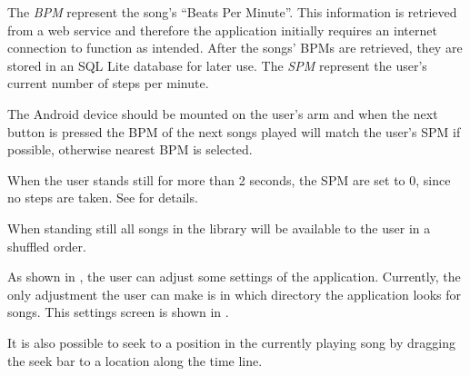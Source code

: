 The \textit{BPM} represent the song's ``Beats Per Minute''. This information is retrieved from a web service and therefore the application initially requires an internet connection to function as intended. After the songs' BPMs are retrieved, they are stored in an SQL Lite database for later use. The \textit{SPM} represent the user's current number of steps per minute.

The Android device should be mounted on the user's arm and when the next button is pressed the BPM of the next songs played will match the user's SPM if possible, otherwise nearest BPM is selected.

When the user stands still for more than 2 seconds, the SPM are set to 0, since no steps are taken. See  for details. 

When standing still all songs in the library will be available to the user in a shuffled order.

As shown in , the user can adjust some settings of the application. Currently, the only adjustment the user can make is in which directory the application looks for songs. This settings screen is shown in . 

It is also possible to seek to a position in the currently playing song by dragging the seek bar to a location along the time line. 


